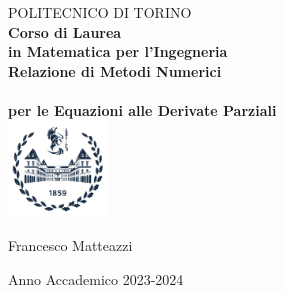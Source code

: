 \begin{titlepage}

\begin{center}

{\huge POLITECNICO DI TORINO}\\[1.5cm]
\textbf{Corso di Laurea\\in Matematica per l'Ingegneria}\\[3cm]

\textbf{\LARGE Relazione di Metodi Numerici\\ \,\\per le Equazioni alle Derivate Parziali }\\[2cm]
\includegraphics[width=0.2\textwidth]{./Pictures/logo_polito_2021.jpg}
\vspace{4cm}



Francesco Matteazzi

\vfill

Anno Accademico 2023-2024
\end{center}

\restoregeometry %

\end{titlepage}